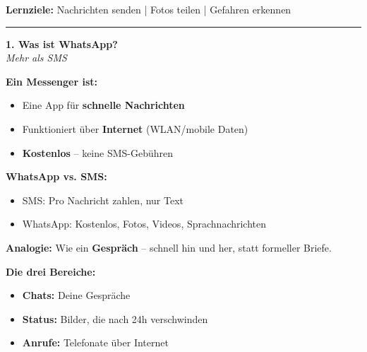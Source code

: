 \documentclass[a4paper,landscape,8pt]{extarticle}
\begin{document}

 \hfill
{\footnotesize\textbf{Lernziele:} Nachrichten senden | Fotos teilen | Gefahren erkennen}

\vspace{1mm}
\hrule
\vspace{1mm}

\begin{minipage}[t]{0.32\linewidth}
\begin{center}
\colorbox{wagreen!15}{%
\begin{minipage}{0.95\linewidth}
\vspace{2mm}
\begin{center}
{\Large\bfseries\textcolor{wagreen}{1. Was ist WhatsApp?}}\\[1pt]
{\footnotesize\itshape Mehr als SMS}
\end{center}
\vspace{2mm}
\end{minipage}%
}
\end{center}

\vspace{1mm}

\textbf{Ein Messenger ist:}
\begin{itemize}
\item Eine App für \textbf{schnelle Nachrichten}
\item Funktioniert über \textbf{Internet} (WLAN/mobile Daten)
\item \textbf{Kostenlos} -- keine SMS-Gebühren
\end{itemize}

\textbf{WhatsApp vs. SMS:}
\begin{itemize}
\item SMS: Pro Nachricht zahlen, nur Text
\item WhatsApp: Kostenlos, Fotos, Videos, Sprachnachrichten
\end{itemize}

\textbf{Analogie:} Wie ein \textbf{Gespräch} -- schnell hin und her, statt formeller Briefe.

\textbf{Die drei Bereiche:}
\begin{itemize}
\item \textbf{Chats:} Deine Gespräche
\item \textbf{Status:} Bilder, die nach 24h verschwinden
\item \textbf{Anrufe:} Telefonate über Internet
\end{itemize}

\end{minipage}%
\end{document}
